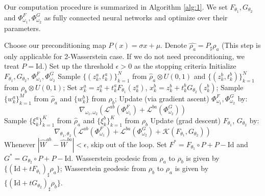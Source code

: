 \documentclass{article}
\begin{document}
Our computation procedure is summarized in Algorithm \ref{alg:1}. We set ${F}_{\theta_1}, {G}_{\theta_2}$ and $\Phi^F_{\omega_1},\Phi^G_{\omega_2}$ as fully connected neural networks and optimize over their parameters.

\begin{algorithm}[hb!]
\caption{Computing Wasserstein geodesic from $\rho_a$ to $\rho_b$ via bidirectional scheme \eqref{bidirection} and preconditioning}
\begin{algorithmic}[1]
\State Choose our preconditioning map $P(x)=\sigma x + \mu$. Denote $\hat{\rho_a} = P_{\sharp}\rho_a$ (This step is only applicable for 2-Wasserstein case. If we do not need preconditioning, we treat $P=\textrm{Id}$.)
\State Set up the threshold $\epsilon>0$ as the stopping criteria
\State Initialize ${F}_{\theta_1}, {G}_{\theta_2}$, $\Phi^F_{\omega_1}, \Phi^G_{\omega_2}$
\State Sample $\{(z^{a}_k,t^{a}_k)\}_{k=1}^N$ from $\hat{\rho}_a\otimes U(0,1)$ and $\{(z^b_k, t^b_k)\}_{k=1}^N$ from $\rho_b\otimes U(0,1)$; 
\State Set $x^a_k = z^a_k+t^a_k {F}_{\theta_1}(z^a_k)$,  $x^b_k = z^b_k + t^b_k {G}_{\theta_2}(z^b_k)$;
\State Sample $\{w^a_k\}_{k=1}^M$ from $\hat{\rho}_a$ and $\{w^b_k\}$ from $\rho_b$;
\State Update (via gradient ascent) $\Phi^F_{\omega_1}, \Phi^G_{\omega_2}$ by:
\begin{equation*}
    \nabla_{\omega_1, \omega_2} (\mathcal{L}^{ab}(\Phi^F_{\omega_1}) +\mathcal{L}^{ba}(\Phi^G_{\omega_2}))
\end{equation*}
\EndFor
\State Sample $\{\xi^a_k\}_{k=1}^K$ from $\hat{\rho}_a$ and $\{\xi^b_k\}_{k=1}^K$ from $\rho_b$
\State Update (grad descent) ${F}_{\theta_1}$, ${G}_{\theta_2}$ by:
\begin{equation*}
 \nabla_{\theta_1, \theta_2} ( \mathcal{L}^{ab}(\Phi_{\omega_1}^F) + \mathcal{L}^{ba}(\Phi_{\omega_2}^G) +\mathcal{K}({F}_{\theta_1}, {G}_{\theta_2})  )
\end{equation*}
\State Whenever $|\widehat{W}^{ab}-\widehat{W}^{ba}|<\epsilon$, skip out of the loop.
\EndFor
\State Set ${F}^* = {F}_{\theta_1}\circ P + P - \textrm{Id}$ and ${G}^* = {G}_{\theta_2}\circ P + P - \textrm{Id}$.
\State Wasserstein geodesic from $\rho_a$ to $\rho_b$ is given by $\{(\textrm{Id}+t{F}_{\theta_1})_{\sharp}\rho_a\}$; Wasserstein geodesic from $\rho_b$ to $\rho_a$ is given by $\{(\textrm{Id}+t{G}_{\theta_2})_{\sharp}\rho_b\}$. 
\end{algorithmic}
\label{alg:1}
\end{algorithm}
\end{document}
